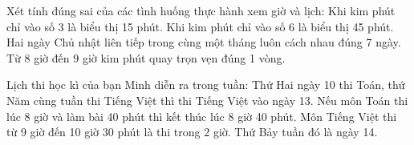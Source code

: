 \begin{ex} %
Xét tính đúng sai của các tình huống thực hành xem giờ và lịch:
\choiceTF
{\True Khi kim phút chỉ vào số 3 là biểu thị 15 phút.}
{Khi kim phút chỉ vào số 6 là biểu thị 45 phút.}
{\True Hai ngày Chủ nhật liên tiếp trong cùng một tháng luôn cách nhau đúng 7 ngày.}
{\True Từ 8 giờ đến 9 giờ kim phút quay trọn vẹn đúng 1 vòng.}
\end{ex}

\begin{ex} %
Lịch thi học kì của bạn Minh diễn ra trong tuần:
\choiceTF
{\True Thứ Hai ngày 10 thi Toán, thứ Năm cùng tuần thi Tiếng Việt thì thi Tiếng Việt vào ngày 13.}
{\True Nếu môn Toán thi lúc 8 giờ và làm bài 40 phút thì kết thúc lúc 8 giờ 40 phút.}
{Môn Tiếng Việt thi từ 9 giờ đến 10 giờ 30 phút là thi trong 2 giờ.}
{Thứ Bảy tuần đó là ngày 14.}
\end{ex}

